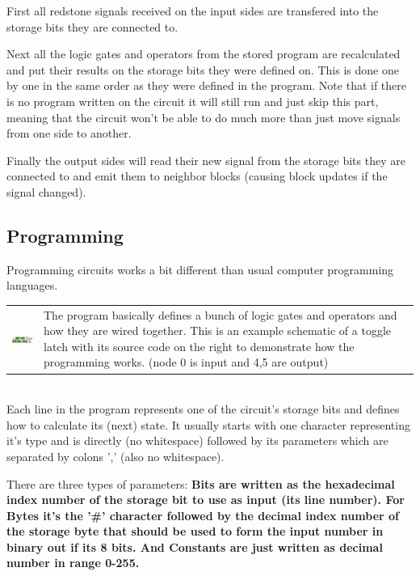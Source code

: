 \documentclass[11pt]{article} %
\makeatletter
\newcommand{\imgtex}{\begin{tabularx}{\textwidth}{@{}c@{ }X@{}}}
\makeatother
\begin{document}
First all redstone signals received on the input sides are transfered into the storage bits they are connected to.

Next all the logic gates and operators from the stored program are recalculated and put their results on the storage bits they were defined on. This is done one by one in the same order as they were defined in the program. Note that if there is no program written on the circuit it will still run and just skip this part, meaning that the circuit won't be able to do much more than just move signals from one side to another.

Finally the output sides will read their new signal from the storage bits they are connected to and emit them to neighbor blocks (causing block updates if the signal changed).
\subsection{Programming}
Programming circuits works a bit different than usual computer programming languages. 
\imgtex \includegraphics[align = t, scale = 2]{program_diagram} & The program basically defines a bunch of logic gates and operators and how they are wired together. This is an example schematic of a toggle latch with its source code on the right to demonstrate how the programming works. (node 0 is input and 4,5 are output)\end{tabularx} \\
Each line in the program represents one of the circuit's storage bits and defines how to calculate its (next) state. It usually starts with one character representing it's type and is directly (no whitespace) followed by its parameters which are separated by colons ',' (also no whitespace).

There are three types of parameters: \bf Bits \rm are written as the hexadecimal index number of the storage bit to use as input (its line number). For \bf Bytes \rm it's the '\#' character followed by the decimal index number of the storage byte that should be used to form the input number in binary out if its 8 bits. And \bf Constants \rm are just written as decimal number in range 0-255.
\end{document}
